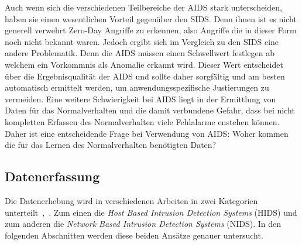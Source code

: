                 Auch wenn sich die verschiedenen Teilbereiche der AIDS stark unterscheiden,
                haben sie einen wesentlichen Vorteil gegenüber den SIDS\@.
                Denn ihnen ist es nicht generell verwehrt Zero-Day Angriffe zu erkennen,
                also Angriffe die in dieser Form noch nicht bekannt waren. 
                Jedoch ergibt sich im Vergleich zu den SIDS eine andere Problematik.
                Denn die AIDS müssen einen Schwellwert festlegen ab welchem ein Vorkommnis als Anomalie erkannt wird.
                Dieser Wert entscheidet über die Ergebnisqualität der AIDS 
                und sollte daher sorgfältig und am besten automatisch ermittelt werden,
                um anwendungsspezifische Justierungen zu vermeiden. 
                Eine weitere Schwierigkeit bei AIDS liegt in der Ermittlung von Daten für das Normalverhalten und die damit verbundene Gefahr,
                dass bei nicht kompletten Erfassen des Normalverhalten viele Fehlalarme enstehen können.
                Daher ist eine entscheidende Frage bei Verwendung von AIDS\@: Woher kommen die für das Lernen des Normalverhalten benötigten Daten?

        \subsection{Datenerfassung}\label{sec:Datenerfassung}
            Die Datenerhebung wird in verschiedenen Arbeiten in zwei Kategorien unterteilt~\cite{IDSsurvey},~\cite{IDSreview}.
            Zum einen die \textit{Host Based Intrusion Detection Systems} (HIDS) 
            und zum anderen die \textit{Network Based Intrusion Detection Systems} (NIDS).
            In den folgenden Abschnitten werden diese beiden Ansätze genauer untersucht.

